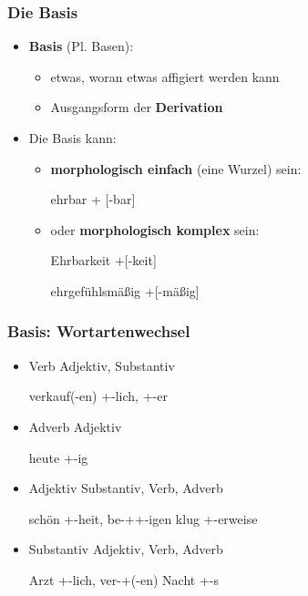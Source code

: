 \begin{frame}
\frametitle{Die Basis}

\begin{itemize}
	\item \textbf{Basis} (Pl. Basen):
	
	\begin{itemize}
		\item etwas, woran etwas affigiert werden kann
		\item Ausgangsform der \textbf{Derivation}
	\end{itemize}
	
	\item Die Basis kann:
	
	\begin{itemize}
		\item \textbf{morphologisch einfach} (eine Wurzel) sein:
		
		\ea ehrbar \ras  [ehr] + [-bar]
		\z
		
		\item oder \textbf{morphologisch komplex} sein:


		\settowidth{} 		
		\ea Ehrbarkeit \ras  \alertred{[[Ehr]+[-bar]]}+[-keit] 

		\ex ehrgefühlsmäßig \ras  \alertred{[[ehr]+[gefühl(s)]]}+[-mäßig]  
		\z
		
	\end{itemize}
	
\end{itemize}


\end{frame}



\begin{frame}
\frametitle{Basis: Wortartenwechsel}

	\begin{itemize}
		\item Verb \ras Adjektiv, Substantiv
		
		\ea verkauf(-en) \ras {}+-lich, +-er
		\z
		
		\item Adverb \ras Adjektiv
		
		\ea heute \ras {}+-ig
		\z
		
		\item Adjektiv \ras Substantiv, Verb, Adverb
		
		\eal 
			\ex schön \ras {}+-heit, be-++-igen
			\ex klug \ras {}+-erweise
		\zl
		
		\item Substantiv \ras Adjektiv, Verb, Adverb

		\eal 
			\ex Arzt \ras {}+-lich, ver-+(-en)
			\ex Nacht \ras {}+-s
		\zl
		
	\end{itemize}
	
\end{frame}



